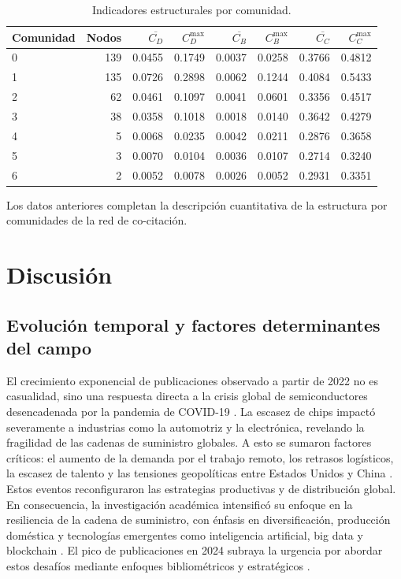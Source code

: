 \documentclass[twoside, twocolumn]{article}
\newcommand{\1}{\mathds{1}}						%
\begin{document}
\begin{table}[t]
\centering
\caption{Indicadores estructurales por comunidad.}
\label{tab:metricas_comunidades}
\begin{tabular}{lrrrrrrr}
\toprule
Comunidad & Nodos & $\overline{C_D}$ & $C_D^{\text{max}}$ & $\overline{C_B}$ & $C_B^{\text{max}}$ & $\overline{C_C}$ & $C_C^{\text{max}}$\\
\midrule
0 & 139 & 0.0455 & 0.1749 & 0.0037 & 0.0258 & 0.3766 & 0.4812\\
1 & 135 & 0.0726 & 0.2898 & 0.0062 & 0.1244 & 0.4084 & 0.5433\\
2 &  62 & 0.0461 & 0.1097 & 0.0041 & 0.0601 & 0.3356 & 0.4517\\
3 &  38 & 0.0358 & 0.1018 & 0.0018 & 0.0140 & 0.3642 & 0.4279\\
4 &   5 & 0.0068 & 0.0235 & 0.0042 & 0.0211 & 0.2876 & 0.3658\\
5 &   3 & 0.0070 & 0.0104 & 0.0036 & 0.0107 & 0.2714 & 0.3240\\
6 &   2 & 0.0052 & 0.0078 & 0.0026 & 0.0052 & 0.2931 & 0.3351\\
\bottomrule
\end{tabular}
\end{table}

Los datos anteriores completan la descripción cuantitativa de la estructura por comunidades de la red de co-citación.

\section{Discusión}

\subsection{Evolución temporal y factores determinantes del campo}
El crecimiento exponencial de publicaciones observado a partir de 2022 no es casualidad, sino una respuesta directa a la crisis global de semiconductores desencadenada por la pandemia de COVID-19 \cite{Xiong2024}. La escasez de chips impactó severamente a industrias como la automotriz y la electrónica, revelando la fragilidad de las cadenas de suministro globales. A esto se sumaron factores críticos: el aumento de la demanda por el trabajo remoto, los retrasos logísticos, la escasez de talento y las tensiones geopolíticas entre Estados Unidos y China \cite{Bown2020}. Estos eventos reconfiguraron las estrategias productivas y de distribución global. En consecuencia, la investigación académica intensificó su enfoque en la resiliencia de la cadena de suministro, con énfasis en diversificación, producción doméstica y tecnologías emergentes como inteligencia artificial, big data y blockchain \cite{Xu2019}. El pico de publicaciones en 2024 subraya la urgencia por abordar estos desafíos mediante enfoques bibliométricos y estratégicos \cite{Xiong2024}.
\end{document}
